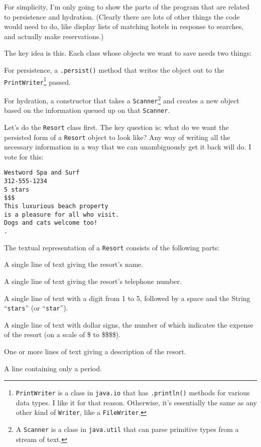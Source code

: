 For simplicity, I'm only going to show the parts of the program that are
related to persistence and hydration. (Clearly there are lots of other things
the code would need to do, like display lists of matching hotels in response
to searches, and actually make reservations.)

The key idea is this. Each class whose objects we want to save needs two
things:

\begin{compactitem}

\item For persistence, a \texttt{.persist()} method that writes the object out
to the \texttt{PrintWriter}\footnote{\texttt{PrintWriter} is a class in
\texttt{java.io} that has \texttt{.println()} methods for various data types.
I like it for that reason. Otherwise, it's essentially the same as any other
kind of \texttt{Writer}, like a \texttt{FileWriter}.} passed.

\item For hydration, a constructor that takes a \texttt{Scanner}\footnote{A
\texttt{Scanner} is a class in \texttt{java.util} that can parse primitive
types from a stream of text.} and creates a new object based on the
information queued up on that \texttt{Scanner}.

\end{compactitem}

Let's do the \texttt{Resort} class first. The key question is: what do we want
the persisted form of a \texttt{Resort} object to look like? Any way of
writing all the necessary information in a way that we can unambiguously get
it back will do. I vote for this:

\begin{Verbatim}[fontsize=\small,samepage=true,frame=lines]
Westword Spa and Surf
312-555-1234
5 stars
$$$
This luxurious beach property
is a pleasure for all who visit.
Dogs and cats welcome too!
.
\end{Verbatim}

The textual representation of a \texttt{Resort} consists of the following
parts:

\begin{compactenum}
\item A single line of text giving the resort's name.
\item A single line of text giving the resort's telephone number.
\item A single line of text with a digit from 1 to 5, followed by a space and
the String ``\texttt{stars}'' (or ``\texttt{star}'').
\item A single line of text with dollar signs, the number of which indicates
the expense of the resort (on a scale of \$ to \$\$\$\$).
\item One or more lines of text giving a description of the resort.
\item A line containing only a period. \label{item:delimiter}
\end{compactenum}

